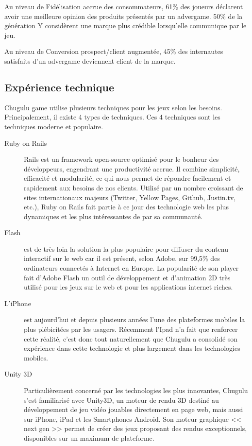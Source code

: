 Au niveau de Fidélisation accrue des consommateurs, 61\% des joueurs déclarent avoir une meilleure opinion des produits présentés par un advergame. 50\% de la génération Y considèrent une marque plus crédible lorsqu'elle communique par le jeu.

Au niveau de Conversion prospect/client augmentée, 45\% des internautes satisfaits d’un advergame deviennent client de la marque.




\subsection{Expérience technique} %
\label{ssub:expérience_technique}

Chugulu game utilise plusieurs techniques pour les jeux selon les besoins. Principalement, il existe 4 types de techniques. Ces 4 techniques sont les techniques moderne et populaire. 

\begin{description}
	\item[Ruby on Rails] Rails est un framework open-source optimisé pour le bonheur des développeurs, engendrant une productivité accrue. Il combine simplicité, efficacité et modularité, ce qui nous permet de répondre facilement et rapidement aux besoins de nos clients. Utilisé par un nombre croissant de sites internationaux majeurs (Twitter, Yellow Pages, Github, Justin.tv, etc.), Ruby on Rails fait partie à ce jour des technologie web les plus dynamiques et les plus intéressantes de par sa communauté.
	\item[Flash] est de très loin la solution la plus populaire pour diffuser du contenu interactif sur le web car il est présent, selon Adobe, sur 99,5\% des ordinateurs connectés à Internet en Europe. La popularité de son player fait d’Adobe Flash un outil de développement et d’animation 2D très utilisé pour les jeux sur le web et pour les applications internet riches.
	\item[L'iPhone] est aujourd'hui et depuis plusieurs années l'une des plateformes mobiles la plus plébicitées par les usagers. Récemment l'Ipad n'a fait que renforcer cette réalité, c'est donc tout naturellement que Chugulu a consolidé son expérience dans cette technologie et plus largement dans les technologies mobiles.
	\item[Unity 3D] Particulièrement concerné par les technologies les plus innovantes, Chugulu s’est familiarisé avec Unity3D, un moteur de rendu 3D destiné au développement de jeu vidéo jouables directement en page web, mais aussi sur iPhone, iPad et les Smartphones Android. Son moteur graphique << next gen >> permet de créer des jeux proposant des rendus exceptionnels, disponibles sur un maximum de plateforme.
\end{description}



